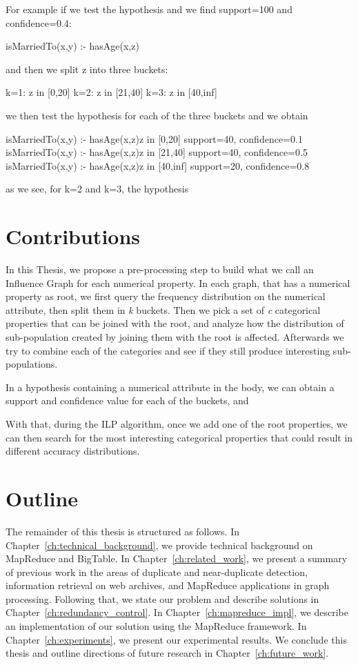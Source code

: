 For example if we test the hypothesis and we find support=100 and confidence=0.4:

isMarriedTo(x,y) :- hasAge(x,z)

and then we split z into three buckets:

k=1: z in [0,20]
k=2: z in [21,40]
k=3: z in [40,inf]

we then test the hypothesis for each of the three buckets and we obtain

isMarriedTo(x,y) :- hasAge(x,z)z in [0,20]	support=40, confidence=0.1
isMarriedTo(x,y) :- hasAge(x,z)z in [21,40]	support=40, confidence=0.5
isMarriedTo(x,y) :- hasAge(x,z)z in [40,inf]	support=20, confidence=0.8

as we see, for k=2 and k=3, the hypothesis 

\section{Contributions}
In this Thesis, we propose a pre-processing step to build what we call an Influence Graph for each numerical property. In each graph, that has a numerical property as root, we first query the frequency distribution on the numerical attribute, then split them in \emph{k} buckets. Then we pick a set of \emph{c} categorical properties that can be joined with the root, and analyze how the distribution of sub-population created by joining them with the root is affected. Afterwards we try to combine each of the categories and see if they still produce interesting sub-populations.

In a hypothesis containing a numerical attribute in the body, we can obtain a support and confidence value for each of the buckets, and 

With that, during the ILP algorithm, once we add one of the root properties, we can then search for the most interesting categorical properties that could result in different accuracy distributions.

\section{Outline}

The remainder of this thesis is structured as follows. In
Chapter~\ref{ch:technical_background}, we provide technical background on
MapReduce and BigTable. In Chapter~\ref{ch:related_work}, we present a
summary of previous work in the areas of duplicate and near-duplicate detection,
information retrieval on web archives, and MapReduce applications in graph
processing. Following that, we state our problem and describe solutions in
Chapter~\ref{ch:redundancy_control}. In Chapter~\ref{ch:mapreduce_impl}, we
describe an implementation of our solution using the MapReduce framework. In
Chapter~\ref{ch:experiments}, we present our experimental results. We conclude
this thesis and outline directions of future research in Chapter~\ref{ch:future_work}.

